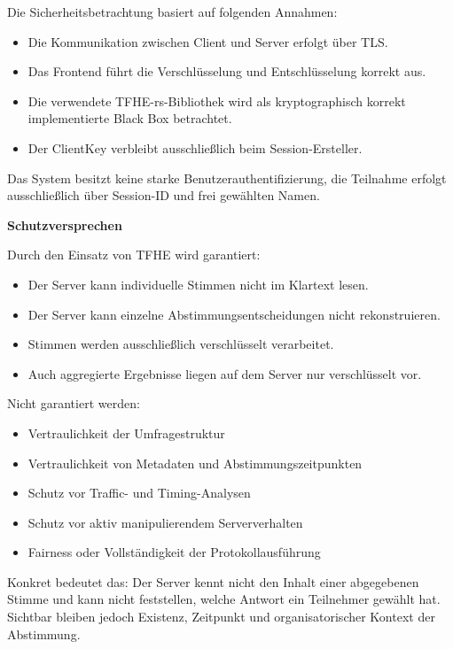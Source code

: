 Die Sicherheitsbetrachtung basiert auf folgenden Annahmen:

\begin{itemize}
    \item Die Kommunikation zwischen Client und Server erfolgt über TLS.
    \item Das Frontend führt die Verschlüsselung und Entschlüsselung korrekt aus.
    \item Die verwendete TFHE-rs-Bibliothek wird als kryptographisch korrekt implementierte Black Box betrachtet. 
    \item Der ClientKey verbleibt ausschließlich beim Session-Ersteller.
\end{itemize}

Das System besitzt keine starke Benutzerauthentifizierung, die Teilnahme erfolgt ausschließlich über Session-ID und frei gewählten Namen.

\textbf{Schutzversprechen}

Durch den Einsatz von TFHE wird garantiert:

\begin{itemize}
    \item Der Server kann individuelle Stimmen nicht im Klartext lesen.
    \item Der Server kann einzelne Abstimmungsentscheidungen nicht rekonstruieren.
    \item Stimmen werden ausschließlich verschlüsselt verarbeitet. 
    \item Auch aggregierte Ergebnisse liegen auf dem Server nur verschlüsselt vor.
\end{itemize}

Nicht garantiert werden:

\begin{itemize}
    \item Vertraulichkeit der Umfragestruktur
    \item Vertraulichkeit von Metadaten und Abstimmungszeitpunkten
    \item Schutz vor Traffic- und Timing-Analysen
    \item Schutz vor aktiv manipulierendem Serververhalten
    \item Fairness oder Vollständigkeit der Protokollausführung
\end{itemize}

Konkret bedeutet das: Der Server kennt nicht den Inhalt einer abgegebenen Stimme und kann nicht feststellen, welche Antwort ein Teilnehmer gewählt hat. Sichtbar bleiben jedoch Existenz, Zeitpunkt und organisatorischer Kontext der Abstimmung.

